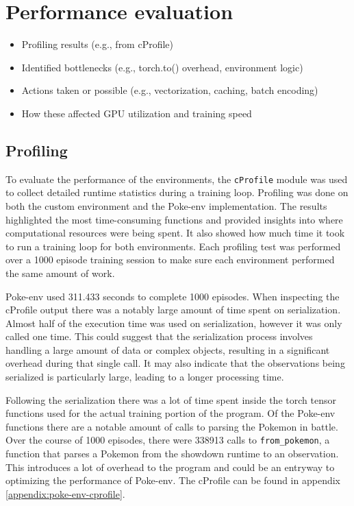 \section{Performance evaluation}
\label{sec:performance-evaluation}


\begin{itemize}
    \item Profiling results (e.g., from cProfile)
    \item Identified bottlenecks (e.g., torch.to() overhead, environment logic)
    \item Actions taken or possible (e.g., vectorization, caching, batch encoding)
    \item How these affected GPU utilization and training speed
\end{itemize}

\subsection{Profiling}
\label{sec:profiling}
To evaluate the performance of the environments, the \lstinline|cProfile| module was used to collect detailed runtime statistics during a training loop. 
Profiling was done on both the custom environment and the Poke-env implementation. The results highlighted the most time-consuming functions and provided 
insights into where computational resources were being spent. It also showed how much time it took to run a training loop for both environments.
Each profiling test was performed over a 1000 episode training session to make sure each environment performed the same amount of work.

Poke-env used 311.433 seconds to complete 1000 episodes. When inspecting the cProfile output there was a notably large amount of time spent on serialization.
Almost half of the execution time was used on serialization, however it was only called one time. This could suggest that the serialization process involves 
handling a large amount of data or complex objects, resulting in a significant overhead during that single call. It may also indicate that the 
observations being serialized is particularly large, leading to a longer processing time. 

Following the serialization there was a lot of time spent inside the torch tensor functions used for the actual training portion of the program. Of the Poke-env
functions there are a notable amount of calls to parsing the Pokemon in battle. Over the course of 1000 episodes, there were 338913 calls to \lstinline|from_pokemon|, 
a function that parses a Pokemon from the showdown runtime to an observation. This introduces a lot of overhead to the program and could be an entryway
to optimizing the performance of Poke-env. The cProfile can be found in appendix \ref{appendix:poke-env-cprofile}.


